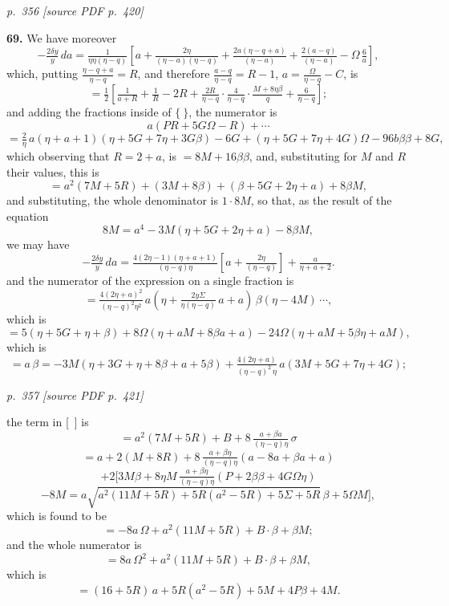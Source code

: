 \documentclass[11pt,a4paper]{article}
\newcommand{\pagemarker}[2]{\par\bigskip\noindent\textit{p.~#1 [source PDF p.~#2]}\par\smallskip}
\begin{document}
\clearpage

\bigskip
\pagemarker{356}{420}
\smallskip

\textbf{69.} We have moreover
\[
-\tfrac{2\delta y}{y}\,da = \tfrac{1}{\eta\eta(\eta - q)}\!\left[a + \tfrac{2\eta}{(\eta - a)(\eta - q)} + \tfrac{2a(\eta - q + a)}{(\eta - a)} + \tfrac{2(a - q)}{(\eta - a)} - \Omega\,\tfrac{6}{a}\right],
\]
which, putting $\tfrac{\eta - q + a}{\eta - q} = R$, and therefore $\tfrac{a - q}{\eta - q} = R - 1$, $a = \tfrac{\Omega}{\eta - q} - C$, is
\[
= \tfrac{1}{2}\!\left[\tfrac{1}{a + R} + \tfrac{1}{R} - 2R + \tfrac{2R}{\eta - q}\cdot\tfrac{4}{\eta - q}\cdot\tfrac{M + 8\eta\beta}{q} + \tfrac{6}{\eta - q}\right];
\]
and adding the fractions inside of $\{\ \}$, the numerator is
\[
a(P R + 5G\Omega - R) + \cdots
\]
\[
= \tfrac{2}{\eta}\,a(\eta + a + 1)(\eta + 5G + 7\eta + 3G\beta) - 6G + (\eta + 5G + 7\eta + 4G)\Omega - 96b\beta\beta + 8G,
\]
which observing that $R = 2 + a$, is $= 8M + 16\beta\beta$,
and, substituting for $M$ and $R$ their values, this is
\[
= a^2(7M + 5R) + (3M + 8\beta) + (\beta + 5G + 2\eta + a) + 8\beta M,
\]
and substituting, the whole denominator is $1 \cdot 8M$, so that, as the result of the equation
\[
8M = a^4 - 3M(\eta + 5G + 2\eta + a) - 8\beta M,
\]
we may have
\[
-\tfrac{2\delta y}{y}\,da = \tfrac{4(2\eta - 1)(\eta + a + 1)}{(\eta - q)\eta}\!\left[a + \tfrac{2\eta}{(\eta - q)}\right] + \tfrac{a}{\eta + a + 2}.
\]
and the numerator of the expression on a single fraction is
\[
= \tfrac{4(2\eta + a)^2}{(\eta - q)^2 \eta^2}\,a(\eta + \tfrac{2y\Sigma}{\eta(\eta - q)}\,a + a)\,\beta(\eta - 4M)\,\cdots,
\]
which is
\[
= 5(\eta + 5G + \eta + \beta) + 8\Omega(\eta + a M + 8\beta a + a) - 24\Omega(\eta + a M + 5\beta\eta + a M),
\]
which is
\[
= a\,\beta = -3M(\eta + 3G + \eta + 8\beta + a + 5\beta) + \tfrac{4(2\eta + a)}{(\eta - q)^2\,\eta}\,a(3M + 5G + 7\eta + 4G);
\]

\clearpage

\bigskip
\pagemarker{357}{421}
\smallskip

the term in [\ ] is
\[
= a^2(7M + 5R) + B + 8\,\tfrac{a + \beta a}{(\eta - q)\eta}\,\sigma
\]
\[
= a + 2(M + 8R) + 8\,\tfrac{a + \beta\eta}{(\eta - q)\eta}\!\left(a - 8a + \beta a + a\right)
\]
\[
+ 2[3M\beta + 8\eta M\,\tfrac{a + \beta\eta}{(\eta - q)\eta}\!\left(P + 2\beta\beta + 4G\Omega\eta\right)
\]
\[
- 8M = a\sqrt{a^2(11M + 5R) + 5R(a^2 - 5R) + 5\Sigma + 5R}\,\beta + 5\Omega M],
\]
which is found to be
\[
= -8a\,\Omega + a^2(11M + 5R) + B\cdot\beta + \beta M;
\]
and the whole numerator is
\[
= 8a\,\Omega^2 + a^2(11M + 5R) + B\cdot\beta + \beta M,
\]
which is
\[
= (16 + 5R)\,a + 5R(a^2 - 5R) + 5M + 4P\beta + 4M.
\]
\end{document}

